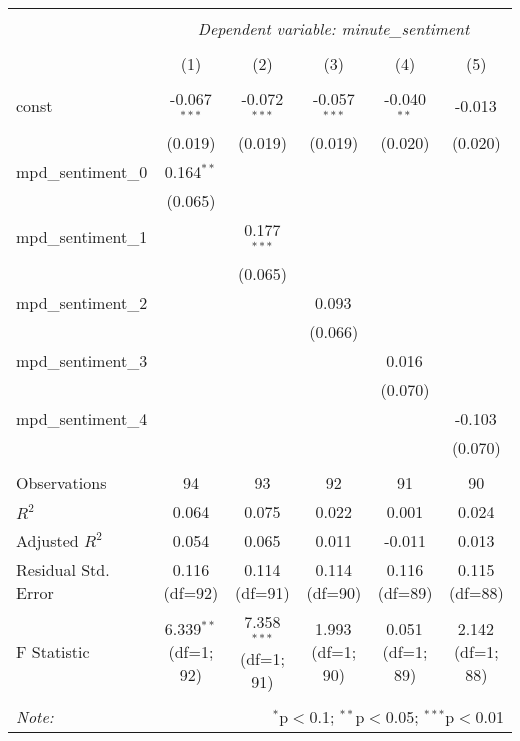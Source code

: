 \documentclass[12pt, letterpaper]{article}
\begin{document}
\begin{table}[H]
\begin{adjustbox}{width=\textwidth}
\centering
\begin{tabular}{@{}lccccc@{}}
\\[-1.8ex]\hline
\hline \\[-1.8ex]
& \multicolumn{5}{c}{\textit{Dependent variable: minute\_sentiment}} \\
\cline{2-6}
\\[-1.8ex] & (1) & (2) & (3) & (4) & (5) \\
\hline \\[-1.8ex]
const & -0.067$^{***}$ & -0.072$^{***}$ & -0.057$^{***}$ & -0.040$^{**}$ & -0.013$^{}$ \\
& (0.019) & (0.019) & (0.019) & (0.020) & (0.020) \\
mpd\_sentiment\_0 & 0.164$^{**}$ & & & & \\
& (0.065) & & & & \\
mpd\_sentiment\_1 & & 0.177$^{***}$ & & & \\
& & (0.065) & & & \\
mpd\_sentiment\_2 & & & 0.093$^{}$ & & \\
& & & (0.066) & & \\
mpd\_sentiment\_3 & & & & 0.016$^{}$ & \\
& & & & (0.070) & \\
mpd\_sentiment\_4 & & & & & -0.103$^{}$ \\
& & & & & (0.070) \\
\hline \\[-1.8ex]
Observations & 94 & 93 & 92 & 91 & 90 \\
$R^2$ & 0.064 & 0.075 & 0.022 & 0.001 & 0.024 \\
Adjusted $R^2$ & 0.054 & 0.065 & 0.011 & -0.011 & 0.013 \\
Residual Std. Error & 0.116 (df=92) & 0.114 (df=91) & 0.114 (df=90) & 0.116 (df=89) & 0.115 (df=88) \\
F Statistic & 6.339$^{**}$ (df=1; 92) & 7.358$^{***}$ (df=1; 91) & 1.993$^{}$ (df=1; 90) & 0.051$^{}$ (df=1; 89) & 2.142$^{}$ (df=1; 88) \\
\hline
\hline \\[-1.8ex]
\textit{Note:} & \multicolumn{5}{r}{$^{*}$p$<$0.1; $^{**}$p$<$0.05; $^{***}$p$<$0.01} \\
\end{tabular}
\end{adjustbox}
\end{table}
\end{document}
